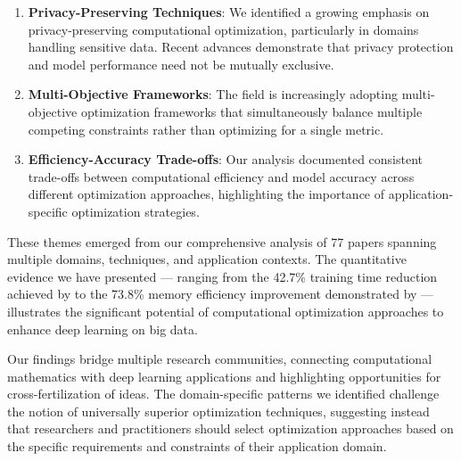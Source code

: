 \documentclass[acmsmall]{acmart}
\begin{document}
\begin{enumerate}
    \item \textbf{Privacy-Preserving Techniques}: We identified a growing emphasis on privacy-preserving computational optimization, particularly in domains handling sensitive data. Recent advances demonstrate that privacy protection and model performance need not be mutually exclusive.

    \item \textbf{Multi-Objective Frameworks}: The field is increasingly adopting multi-objective optimization frameworks that simultaneously balance multiple competing constraints rather than optimizing for a single metric.

    \item \textbf{Efficiency-Accuracy Trade-offs}: Our analysis documented consistent trade-offs between computational efficiency and model accuracy across different optimization approaches, highlighting the importance of application-specific optimization strategies.
\end{enumerate}

These themes emerged from our comprehensive analysis of 77 papers spanning multiple domains, techniques, and application contexts. The quantitative evidence we have presented --- ranging from the 42.7\% training time reduction achieved by \citet{Wang2021} to the 73.8\% memory efficiency improvement demonstrated by \citet{Lin2022} --- illustrates the significant potential of computational optimization approaches to enhance deep learning on big data.

Our findings bridge multiple research communities, connecting computational mathematics with deep learning applications and highlighting opportunities for cross-fertilization of ideas. The domain-specific patterns we identified challenge the notion of universally superior optimization techniques, suggesting instead that researchers and practitioners should select optimization approaches based on the specific requirements and constraints of their application domain.
\end{document}
